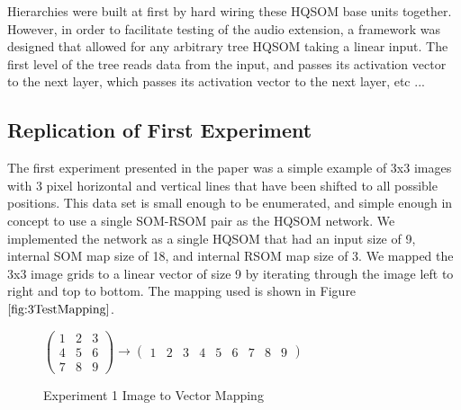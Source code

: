 \documentclass[a4paper,10pt]{article}
\begin{document}
Hierarchies were built at first by hard wiring these HQSOM base units together.  However, in order
to facilitate testing of the audio extension, a framework was designed that allowed for any
arbitrary tree HQSOM taking a linear input.  The first level of the tree reads data from the input,
and passes its activation vector to the next layer, which passes its activation vector to the next
layer, etc ...

\subsection{Replication of First Experiment}
The first experiment presented in the paper was a simple example of 3x3 images with 3
pixel horizontal and vertical lines that have been shifted to all possible positions.  This data
set is small enough to be enumerated, and simple enough in concept to use a single SOM-RSOM pair as
the HQSOM network.  We implemented the network as a single HQSOM that had an input size of 9,
internal SOM map size of 18, and internal RSOM map size of 3.  We mapped the 3x3 image grids
to a linear vector of size 9 by iterating through the image left to right and top to bottom.
The mapping used is shown in Figure $\ref{fig:3TestMapping}$.
\begin{figure}[ht]
\begin{center} 
$\begin{pmatrix}
1 & 2 & 3 \\
4 & 5 & 6 \\
7 & 8 & 9 
\end{pmatrix}
\rightarrow
\begin{pmatrix}
1 & 2 & 3 & 4 & 5 & 6 & 7 & 8 & 9 
\end{pmatrix}
$
\end{center} 
\caption{Experiment 1 Image to Vector Mapping}
\label{fig:3TestMapping}
\end{figure} 
\end{document}
